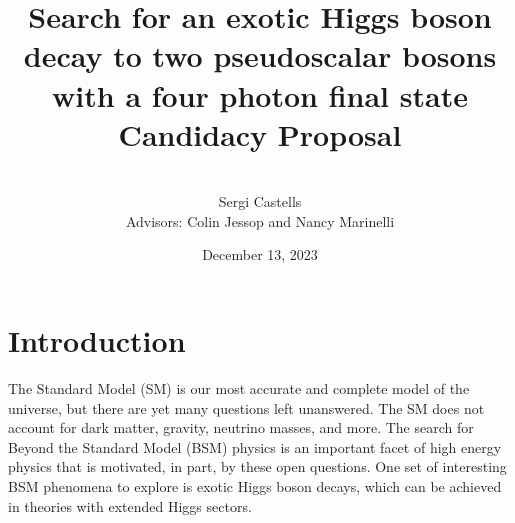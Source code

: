 \documentclass[12pt]{article}
\title{
    Search for an exotic Higgs boson decay to two pseudoscalar bosons with a four photon final state\\[0.2cm]
    \Large Candidacy Proposal
}
\author{\\[0.15cm]Sergi Castells\\[0.25cm] Advisors: Colin Jessop and Nancy Marinelli\\[0.4cm]}
\date{December 13, 2023}
\begin{document}
\maketitle


\section{Introduction}
The Standard Model (SM) is our most accurate and complete model of the universe, but there are yet many questions left unanswered. The SM does not account for dark matter, gravity, neutrino masses, and more. The search for Beyond the Standard Model (BSM) physics is an important facet of high energy physics that is motivated, in part, by these open questions. One set of interesting BSM phenomena to explore is exotic Higgs boson decays, which can be achieved in theories with extended Higgs sectors.\par


\end{document}
